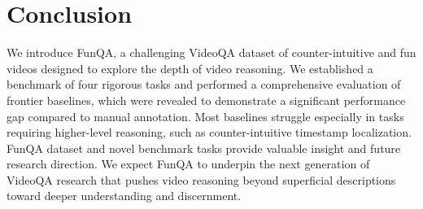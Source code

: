 \section{Conclusion}
We introduce FunQA, a challenging VideoQA dataset of counter-intuitive and fun videos designed to explore the depth of video reasoning. We established a benchmark of four rigorous tasks and performed a comprehensive evaluation of frontier baselines, which were revealed to demonstrate a significant performance gap compared to manual annotation. Most baselines struggle especially in tasks requiring higher-level reasoning, such as counter-intuitive timestamp localization. FunQA dataset and novel benchmark tasks provide valuable insight and future research direction. We expect FunQA to underpin the next generation of VideoQA research that pushes video reasoning beyond superficial descriptions toward deeper understanding and discernment. 